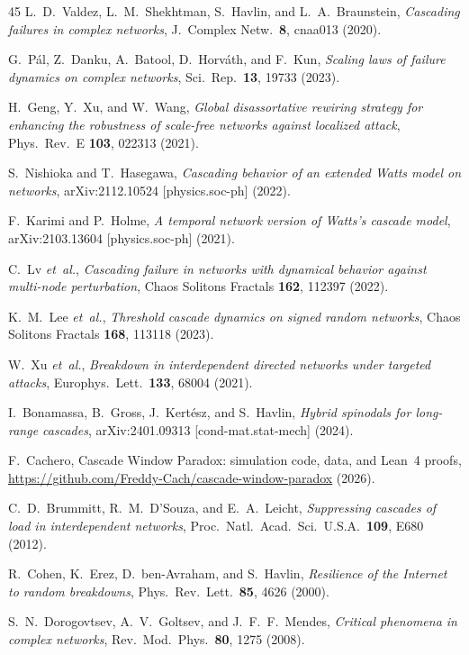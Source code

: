 \documentclass[aps,pre,twocolumn,superscriptaddress,showpacs]{revtex4-2}
\begin{document}
\begin{thebibliography}{45}
L.~D.~Valdez, L.~M.~Shekhtman, S.~Havlin, and L.~A.~Braunstein,
\emph{Cascading failures in complex networks},
J.\ Complex Netw.\ \textbf{8}, cnaa013 (2020).

G.~P\'al, Z.~Danku, A.~Batool, D.~Horv\'ath, and F.~Kun,
\emph{Scaling laws of failure dynamics on complex networks},
Sci.\ Rep.\ \textbf{13}, 19733 (2023).

H.~Geng, Y.~Xu, and W.~Wang,
\emph{Global disassortative rewiring strategy for enhancing the robustness of scale-free networks against localized attack},
Phys.\ Rev.\ E \textbf{103}, 022313 (2021).

S.~Nishioka and T.~Hasegawa,
\emph{Cascading behavior of an extended Watts model on networks},
arXiv:2112.10524 [physics.soc-ph] (2022).

F.~Karimi and P.~Holme,
\emph{A temporal network version of Watts's cascade model},
arXiv:2103.13604 [physics.soc-ph] (2021).

C.~Lv \emph{et~al.},
\emph{Cascading failure in networks with dynamical behavior against multi-node perturbation},
Chaos Solitons Fractals \textbf{162}, 112397 (2022).

K.~M.~Lee \emph{et~al.},
\emph{Threshold cascade dynamics on signed random networks},
Chaos Solitons Fractals \textbf{168}, 113118 (2023).

W.~Xu \emph{et~al.},
\emph{Breakdown in interdependent directed networks under targeted attacks},
Europhys.\ Lett.\ \textbf{133}, 68004 (2021).

I.~Bonamassa, B.~Gross, J.~Kert\'esz, and S.~Havlin,
\emph{Hybrid spinodals for long-range cascades},
arXiv:2401.09313 [cond-mat.stat-mech] (2024).

F.~Cachero,
Cascade Window Paradox: simulation code, data, and Lean~4 proofs,
\url{https://github.com/Freddy-Cach/cascade-window-paradox} (2026).

C.~D.~Brummitt, R.~M.~D'Souza, and E.~A.~Leicht,
\emph{Suppressing cascades of load in interdependent networks},
Proc.\ Natl.\ Acad.\ Sci.\ U.S.A.\ \textbf{109}, E680 (2012).

R.~Cohen, K.~Erez, D.~ben-Avraham, and S.~Havlin,
\emph{Resilience of the Internet to random breakdowns},
Phys.\ Rev.\ Lett.\ \textbf{85}, 4626 (2000).

S.~N.~Dorogovtsev, A.~V.~Goltsev, and J.~F.~F.~Mendes,
\emph{Critical phenomena in complex networks},
Rev.\ Mod.\ Phys.\ \textbf{80}, 1275 (2008).


\end{thebibliography}
\end{document}
